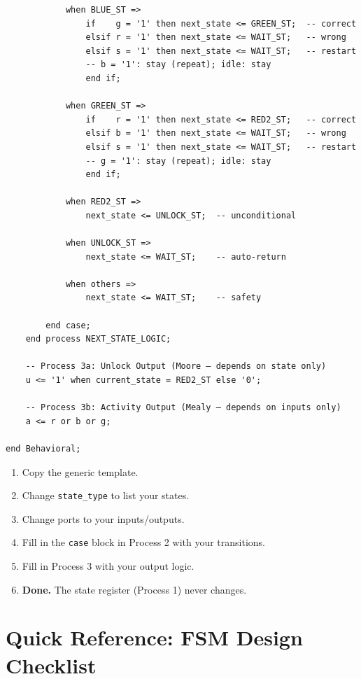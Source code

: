 \documentclass[12pt,a4paper]{article}
\begin{document}
{\begin{verbatim}
            when BLUE_ST =>
                if    g = '1' then next_state <= GREEN_ST;  -- correct
                elsif r = '1' then next_state <= WAIT_ST;   -- wrong
                elsif s = '1' then next_state <= WAIT_ST;   -- restart
                -- b = '1': stay (repeat); idle: stay
                end if;

            when GREEN_ST =>
                if    r = '1' then next_state <= RED2_ST;   -- correct
                elsif b = '1' then next_state <= WAIT_ST;   -- wrong
                elsif s = '1' then next_state <= WAIT_ST;   -- restart
                -- g = '1': stay (repeat); idle: stay
                end if;

            when RED2_ST =>
                next_state <= UNLOCK_ST;  -- unconditional

            when UNLOCK_ST =>
                next_state <= WAIT_ST;    -- auto-return

            when others =>
                next_state <= WAIT_ST;    -- safety

        end case;
    end process NEXT_STATE_LOGIC;

    -- Process 3a: Unlock Output (Moore — depends on state only)
    u <= '1' when current_state = RED2_ST else '0';

    -- Process 3b: Activity Output (Mealy — depends on inputs only)
    a <= r or b or g;

end Behavioral;
\end{verbatim}
}

\begin{tipbox}
\begin{enumerate}
  \item Copy the generic template.
  \item Change \texttt{state\_type} to list your states.
  \item Change ports to your inputs/outputs.
  \item Fill in the \texttt{case} block in Process 2 with your transitions.
  \item Fill in Process 3 with your output logic.
  \item \textbf{Done.} The state register (Process 1) never changes.
\end{enumerate}
\end{tipbox}


\section{Quick Reference: FSM Design Checklist}
\end{document}
